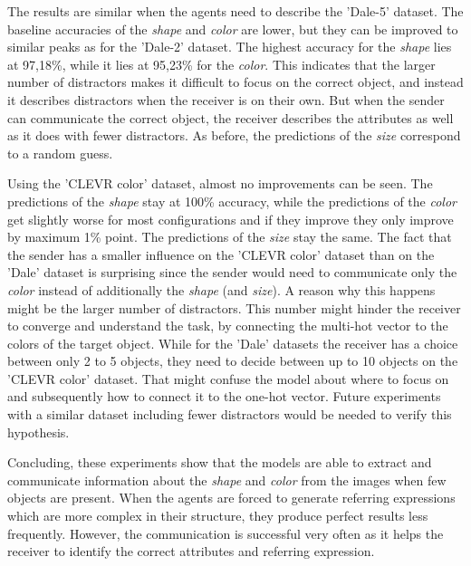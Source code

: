 The results are similar when the agents need to describe the 'Dale-5' dataset.
The baseline accuracies of the \emph{shape} and \emph{color} are lower, but they can be improved to similar peaks as for the 'Dale-2' dataset.
The highest accuracy for the \emph{shape} lies at 97,18\%, while it lies at 95,23\% for the \emph{color}.
This indicates that the larger number of distractors makes it difficult to focus on the correct object, and instead it describes distractors when the receiver is on their own.
But when the sender can communicate the correct object, the receiver describes the attributes as well as it does with fewer distractors.
As before, the predictions of the \emph{size} correspond to a random guess.

Using the 'CLEVR color' dataset, almost no improvements can be seen.
The predictions of the \emph{shape} stay at 100\% accuracy, while the predictions of the \emph{color} get slightly worse for most configurations and if they improve they only improve by maximum 1\% point.
The predictions of the \emph{size} stay the same.
The fact that the sender has a smaller influence on the 'CLEVR color' dataset than on the 'Dale' dataset is surprising since the sender would need to communicate only the \emph{color} instead of additionally the \emph{shape} (and \emph{size}).
A reason why this happens might be the larger number of distractors.
This number might hinder the receiver to converge and understand the task, by connecting the multi-hot vector to the colors of the target object.
While for the 'Dale' datasets the receiver has a choice between only 2 to 5 objects, they need to decide between up to 10 objects on the 'CLEVR color' dataset.
That might confuse the model about where to focus on and subsequently how to connect it to the one-hot vector.
Future experiments with a similar dataset including fewer distractors would be needed to verify this hypothesis.

Concluding, these experiments show that the models are able to extract and communicate information about the \emph{shape} and \emph{color} from the images when few objects are present.
When the agents are forced to generate referring expressions which are more complex in their structure, they produce perfect results less frequently.
However, the communication is successful very often as it helps the receiver to identify the correct attributes and referring expression.